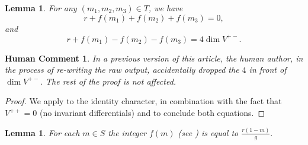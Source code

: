 \documentclass[reqno]{amsart}
\theoremstyle{plain}
\newtheorem{lemma}[theorem]{Lemma}
\newtheorem{commentary}[theorem]{Human Comment}
\begin{document}
\begin{lemma}
  \label{lemma:negativer} For any $(m_1,m_2,m_3) \in T$, we have 
  \[r + f(m_1) + f(m_2) + f(m_3) = 0,\] and 
  \[r + f(m_1) - f(m_2) - f(m_3) = 4\dim V^{+-}.\]
\end{lemma}

\begin{commentary}
  \label{commentary:droppedfour} In a previous version of this article, the human author, in the process of re-writing the raw output, accidentally dropped the $4$ in front of $\dim V^{+-}$. The rest of the proof is not affected.
\end{commentary}


\begin{proof}
  We apply  to the identity character,
  in combination with the fact that $V^{++} = 0$ (no invariant differentials)
  and  to conclude both equations.
\end{proof}

\begin{lemma}
  \label{lemma:f(m)} For each $m \in S$ the integer $f(m)$ (see
  ) is equal to $\frac{r(1-m)}{g}.$
\end{lemma}
\end{document}
